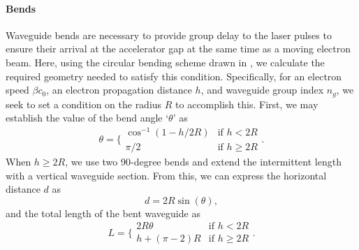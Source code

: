 \paragraph{Bends}

Waveguide bends are necessary to provide group delay to the laser pulses to ensure their arrival at the accelerator gap at the same time as a moving electron beam.
Here, using the circular bending scheme drawn in , we calculate the required geometry  needed to satisfy this condition.
Specifically, for an electron speed $\beta c_0$, an electron propagation distance $h$, and waveguide group index $n_g$, we seek to set a condition on the radius $R$ to accomplish this.  First, we may establish the value of the bend angle `$\theta$' as
\begin{equation}
    \theta = \Bigg\{
 \begin{array}{ll}
  \cos^{-1}(1-h/2R) &\text{if } h < 2R \\
  \pi/2   &\text{if } h \geq 2R
 \end{array}.
\end{equation}
When $h \geq 2R$, we use two 90-degree bends and extend the intermittent length with a vertical waveguide section.
From this, we can express the horizontal distance $d$ as
\begin{equation}
    d = 2R\sin(\theta),
\end{equation}
and the total length of the bent waveguide as
\begin{equation}
    L = \Bigg\{
 \begin{array}{ll}
  2R\theta    &\text{if } h < 2R \\
  h + (\pi-2)R    &\text{if } h \geq 2R
 \end{array}.
\end{equation}


